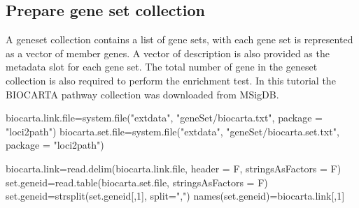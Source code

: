 \documentclass[]{article}
\newcommand{\hlnum}[1]{\textcolor[rgb]{0.816,0.125,0.439}{#1}}%
\newcommand{\hlstr}[1]{\textcolor[rgb]{0.251,0.627,0.251}{#1}}%
\newcommand{\hlstd}[1]{\textcolor[rgb]{0.251,0.251,0.251}{#1}}%
\newcommand{\hlkwc}[1]{\textcolor[rgb]{0.251,0.251,0.251}{#1}}%
\newcommand{\hlkwd}[1]{\textcolor[rgb]{0.878,0.439,0.125}{#1}}%
\newenvironment{Shaded}{\begin{myshaded}}{\end{myshaded}}
\newcommand{\KeywordTok}[1]{\hlkwd{#1}}
\newcommand{\DataTypeTok}[1]{\hlkwc{#1}}
\newcommand{\DecValTok}[1]{\hlnum{#1}}
\newcommand{\StringTok}[1]{\hlstr{#1}}
\newcommand{\NormalTok}[1]{\hlstd{#1}}
\theoremstyle{definition}
\theoremstyle{definition}
\theoremstyle{remark}
\begin{document}
\subsection{Prepare gene set
collection}\label{prepare-gene-set-collection}

A geneset collection contains a list of gene sets, with each gene set is
represented as a vector of member genes. A vector of description is also
provided as the metadata slot for each gene set. The total number of
gene in the geneset collection is also required to perform the
enrichment test. In this tutorial the BIOCARTA pathway collection was
downloaded from MSigDB.

\begin{Shaded}
\begin{Highlighting}[]
\NormalTok{biocarta.link.file=}\KeywordTok{system.file}\NormalTok{(}\StringTok{"extdata"}\NormalTok{, }\StringTok{"geneSet/biocarta.txt"}\NormalTok{, }\DataTypeTok{package =} \StringTok{"loci2path"}\NormalTok{)}
\NormalTok{biocarta.set.file=}\KeywordTok{system.file}\NormalTok{(}\StringTok{"extdata"}\NormalTok{, }\StringTok{"geneSet/biocarta.set.txt"}\NormalTok{, }\DataTypeTok{package =} \StringTok{"loci2path"}\NormalTok{)}

\NormalTok{biocarta.link=}\KeywordTok{read.delim}\NormalTok{(biocarta.link.file, }\DataTypeTok{header =} \NormalTok{F, }\DataTypeTok{stringsAsFactors =} \NormalTok{F)}
\NormalTok{set.geneid=}\KeywordTok{read.table}\NormalTok{(biocarta.set.file, }\DataTypeTok{stringsAsFactors =} \NormalTok{F)}
\NormalTok{set.geneid=}\KeywordTok{strsplit}\NormalTok{(set.geneid[,}\DecValTok{1}\NormalTok{], }\DataTypeTok{split=}\StringTok{","}\NormalTok{)}
\KeywordTok{names}\NormalTok{(set.geneid)=biocarta.link[,}\DecValTok{1}\NormalTok{]}


\end{Highlighting}
\end{Shaded}
\end{document}
